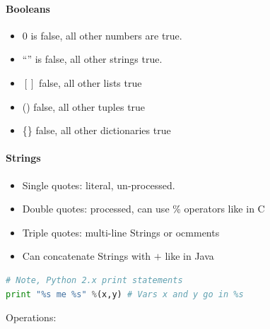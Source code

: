 \documentclass[12 pt]{article}
\begin{document}
\paragraph{Booleans}
\begin{itemize}
\item $0$ is false, all other numbers are true.
\item ``'' is false, all other strings true.
\item $[]$ false, all other lists true
\item () false, all other tuples true
  \item \{\} false, all other dictionaries true
\end{itemize}
\paragraph{Strings}
\begin{itemize}
\item Single quotes: literal, un-processed.
\item Double quotes: processed, can use \% operators like in C
  \item Triple quotes: multi-line Strings or ocmments
\item Can concatenate Strings with $+$ like in Java
\end{itemize}
\begin{lstlisting}[language=python]
# Note, Python 2.x print statements
print "%s me %s" %(x,y) # Vars x and y go in %s
\end{lstlisting}
Operations:
\end{document}
